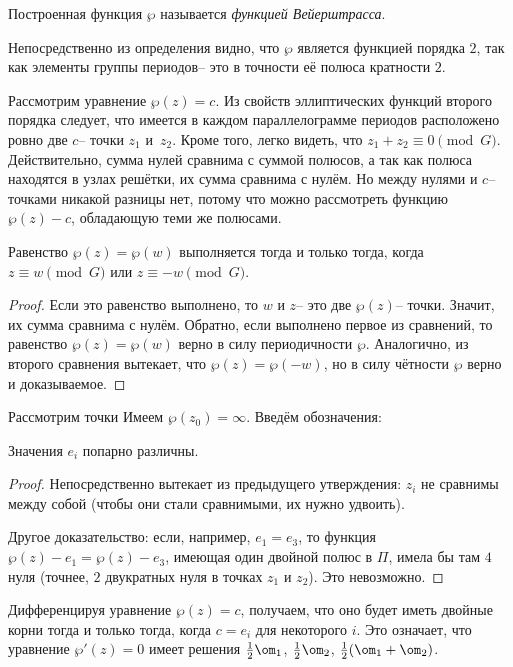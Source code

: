 \documentclass[a4paper]{article}
\begin{document}
\begin{df}
Построенная функция $\wp$ называется \emph{функцией Вейерштрасса}.
\end{df}

Непосредственно из определения видно, что $\wp$ является функцией порядка $2$, так как элементы
группы периодов-- это в точности её полюса кратности $2$.

Рассмотрим уравнение $\wp(z) = c$. Из свойств эллиптических функций второго порядка
следует, что имеется в каждом параллелограмме периодов расположено ровно две $c$-- точки
$z_1$ и~$z_2$. Кроме того, легко видеть, что $z_1 + z_2 \equiv 0\pmod G$. Действительно,
сумма нулей сравнима с суммой полюсов, а так как полюса находятся в узлах решётки, их сумма
сравнима с нулём. Но между нулями и $c$-- точками никакой разницы нет, потому что можно
рассмотреть функцию $\wp(z) - c$, обладающую теми же полюсами.

\begin{stm}
Равенство $\wp(z) = \wp(w)$ выполняется тогда и только тогда, когда $z \equiv w \pmod G$
или $z \equiv -w \pmod G$.
\end{stm}
\begin{proof}
Если это равенство выполнено, то $w$ и $z$-- это две $\wp(z)$-- точки. Значит, их
сумма сравнима с нулём. Обратно, если выполнено первое из сравнений, то равенство
$\wp(z) = \wp(w)$ верно в силу периодичности $\wp$. Аналогично, из второго сравнения
вытекает, что $\wp(z) = \wp(-w)$, но в силу чётности $\wp$ верно и доказываемое.
\end{proof}

Рассмотрим точки
Имеем $\wp(z_0) = \infty$. Введём обозначения:

\begin{stm}
Значения $e_i$ попарно различны.
\end{stm}
\begin{proof}
Непосредственно вытекает из предыдущего утверждения: $z_i$ не сравнимы между
собой (чтобы они стали сравнимыми, их нужно удвоить).

Другое доказательство: если, например, $e_1 = e_3$, то функция $\wp(z) - e_1 = \wp(z) - e_3$,
имеющая один двойной полюс в $\Pi$, имела бы там $4$ нуля (точнее, $2$ двукратных нуля
в точках $z_1$ и $z_2$). Это невозможно.
\end{proof}

Дифференцируя уравнение $\wp(z) = c$, получаем, что оно будет иметь двойные корни
тогда и только тогда, когда $c=e_i$ для некоторого $i$. Это означает, что
уравнение $\wp'(z) = 0$ имеет решения $\frac12\om_1$, $\frac12\om_2$, $\frac12(\om_1+\om_2)$.
\end{document}
